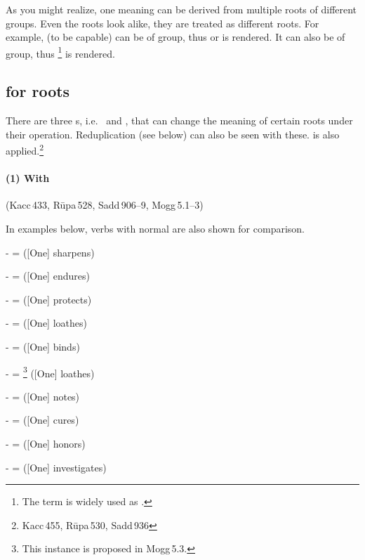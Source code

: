 \bigskip
As you might realize, one meaning can be derived from multiple roots of different groups. Even the roots look alike, they are treated as different roots. For example,  (to be capable) can be of  group, thus  or  is rendered. It can also be of  group, thus \footnote{The term is widely used as .} is rendered.

\subsection*{ for roots}\label{pacca:kha}\label{pacca:cha}\label{pacca:sa}

There are three s, i.e.\  and , that can change the meaning of certain roots under their operation. Reduplication (see below) can also be seen with these.  is also applied.\footnote{Kacc\,455, R\=upa\,530, Sadd\,936}

\paragraph*{(1) With } (Kacc\,433, R\=upa\,528, Sadd\,906--9, Mogg\,5.1--3)\par
In examples below, verbs with normal  are also shown for comparison.\par
-  =  ([One] sharpens)\par
-  =  ([One] endures)\par
-  =  ([One] protects)\par
-  =  ([One] loathes)\par
-  =  ([One] binds)\par
-  = \footnote{This instance is proposed in Mogg\,5.3.} ([One] loathes)\par
-  =  ([One] notes)\par
-  =  ([One] cures)\par
-  =  ([One] honors)\par
-  =  ([One] investigates)\par

